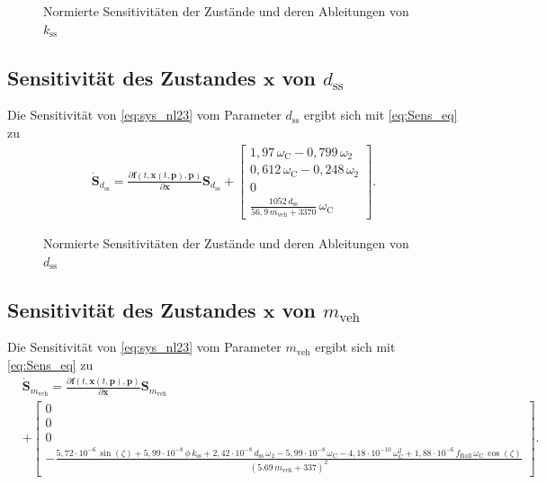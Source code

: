 \begin{figure}
\centering
\newlength\kheight 
\setlength\kheight{8cm}
\newlength\kwidth 
\setlength\kwidth{13cm}

\caption{Normierte Sensitivitäten der Zustände und deren Ableitungen von $k_\mathrm{ss}$}
\label{fig:Sens_k}
\end{figure}


\subsection{Sensitivität des Zustandes $\pmb{x}$ von $d_\mathrm{ss}$}
Die Sensitivität von \eqref{eq:sys_nl23} vom Parameter $d_\mathrm{ss}$ ergibt sich mit \eqref{eq:Sens_eq} zu
\begin{align}
\pmb{\dot{S}}_{d_\mathrm{ss}} = \frac{\partial\pmb{f}(t,\pmb{x}(t,\pmb{p}),\pmb{p})}{\partial \pmb{x}} \pmb{S}_{d_\mathrm{ss}} 
+ \begin{bmatrix} 1,97\,\omega_\mathrm{C} - 0,799\,\omega_\mathrm{2}\\
                  0,612\,\omega_\mathrm{C} - 0,248\,\omega_\mathrm{2}\\
                                                       0\\
 \frac{1052\,d_\mathrm{ss}}{56,9\,m_\mathrm{veh} + 3370}\,\omega_\mathrm{C}\end{bmatrix}.
\end{align}

\begin{figure}
\centering
\newlength\dheight 
\setlength\dheight{8cm}
\newlength\dwidth 
\setlength\dwidth{13cm}

\caption{Normierte Sensitivitäten der Zustände und deren Ableitungen von $d_\mathrm{ss}$}
\label{fig:Sens_d}
\end{figure}

\subsection{Sensitivität des Zustandes $\pmb{x}$ von $m_\mathrm{veh}$}
Die Sensitivität von \eqref{eq:sys_nl23} vom Parameter $m_\mathrm{veh}$ ergibt sich mit \eqref{eq:Sens_eq} zu
\begin{align}
&\dot{\pmb{S}}_{m_\mathrm{veh}} = \frac{\partial\pmb{f}(t,\pmb{x}(t,\pmb{p}),\pmb{p})}{\partial \pmb{x}} \pmb{S}_{m_\mathrm{veh}} \\
&+ \begin{bmatrix} 0 \\ 0 \\ 0 \\ -\frac{5,72\cdot 10^{-6}\,\sin(\zeta) + 5,99\cdot 10^{-8}\,\phi\,k_\mathrm{ss} + 2,42\cdot 10^{-8}\,d_\mathrm{ss}\,\omega_2 - 5,99\cdot 10^{-8}\,\omega_\mathrm{C} - 4,18\cdot 10^{-10}\,\omega_\mathrm{C}^2 + 1,88\cdot 10^{-6}\,f_\mathrm{Roll}\,\omega_\mathrm{C}\,\cos(\zeta)}{(5.69\,m_\mathrm{veh} + 337)^2}\end{bmatrix}.
\end{align}

